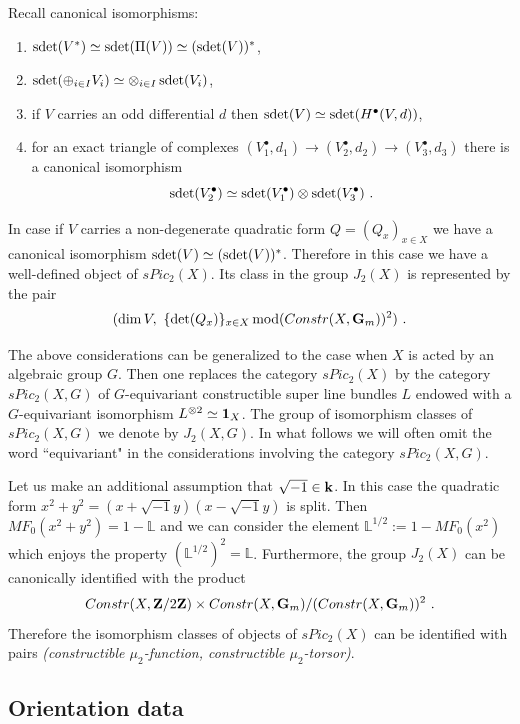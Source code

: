 \documentclass[12pt]{article}
\begin{document}
Recall canonical isomorphisms:
\begin{enumerate}
\item $\operatorname{sdet}(V^{\ast})\simeq \operatorname{sdet}(\Pi(V))\simeq (\operatorname{sdet}(V))^{\ast}$,
\item $\operatorname{sdet}(\oplus_{i\in I}V_i)\simeq \otimes_{i\in I}\operatorname{sdet}(V_i)$,
\item if $V$ carries an odd differential $d$ then $\operatorname{sdet}(V)\simeq \operatorname{sdet}(H^{\bullet}(V,d))$,
\item for an exact triangle of complexes $(V_1^{\bullet},d_1)\to (V_2^{\bullet},d_2)\to (V_3^{\bullet},d_3)$ there is a canonical isomorphism
$$\operatorname{sdet}(V_2^{\bullet})\simeq \operatorname{sdet}(V_1^{\bullet})\otimes \operatorname{sdet}(V_3^{\bullet})\,\,.$$
\end{enumerate}

In case if $V$ carries a non-degenerate quadratic form $Q=(Q_x)_{x\in X}$ we have a canonical isomorphism
$\operatorname{sdet}(V)\simeq (\operatorname{sdet}(V))^{\ast}$. Therefore in this case we have a well-defined object of $sPic_2(X)$. Its class in the group $J_2(X)$ is represented by the pair 
$$(\dim V,\,\,\{\operatorname{det}(Q_x)\}_{x\in X}\operatorname{ mod}(Constr(X,{\bf G}_m))^2)\,\,.$$

The above considerations can be generalized to the case when
$X$ is acted by an algebraic group $G$. Then one replaces the category $sPic_2(X)$ by the category $sPic_2(X,G)$ of $G$-equivariant constructible super line bundles $L$ endowed with a $G$-equivariant isomorphism $L^{\otimes 2}\simeq {\bf 1}_X$. The group of isomorphism classes of  $sPic_2(X,G)$ we denote by $J_2(X,G)$. In what follows we will often omit the word ``equivariant" in the considerations involving the category $sPic_2(X,G)$.


\begin{rmk}
Let us make an additional assumption that $\sqrt{-1}\in {\bf k}$.
In this case the quadratic form $x^2+y^2=(x+\sqrt{-1}y)(x-\sqrt{-1}y)$ is split. Then $MF_0(x^2+y^2)=1-{\mathbb L}$ and we can consider the element ${\mathbb L}^{1/2}:=1-MF_0(x^2)$ which enjoys the property
$({\mathbb L}^{1/2})^2={\mathbb L}$. Furthermore, the group $J_2(X)$ can be canonically identified with the product
$$Constr(X,{\bf Z}/2{\bf Z})\times Constr(X,{\bf G}_m)/(Constr(X,{\bf G}_m))^2\,\,.$$ Therefore the isomorphism classes of objects of $sPic_2(X)$ can be identified with pairs {\it (constructible $\mu_2$-function, constructible $\mu_2$-torsor)}.

\end{rmk}

\subsection{Orientation data}
\end{document}
